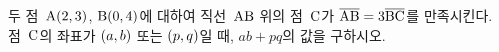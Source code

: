 두 점~$\mathrm{A}(2{,}\mkern3mu\mathopen{}3)$, $\mathrm{B}(0{,}\mkern3mu\mathopen{}4)$에 대하여 직선~$\mathrm{AB}$ 위의 점~$\mathrm{C}$가 $\overline{\mathrm{AB}}=3\overline{\mathrm{BC}}$를 만족시킨다. 점~$\mathrm{C}$의 좌표가 $(a{,}\mkern3mu\mathopen{}b)$ 또는 $(p{,}\mkern3mu\mathopen{}q)$일 때, $ab+pq$의 값을 구하시오.
